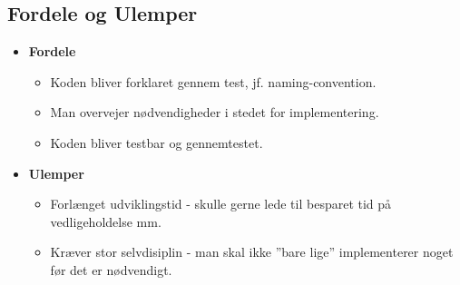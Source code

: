 \subsection{Fordele og Ulemper}

\begin{itemize}
	
	\item \textbf{Fordele}	
	\begin{itemize}
		\item Koden bliver forklaret gennem test, jf. naming-convention.
		\item Man overvejer nødvendigheder i stedet for implementering.
		\item Koden bliver testbar og gennemtestet.
	\end{itemize}
	
	\item \textbf{Ulemper}	
	\begin{itemize}
		\item Forlænget udviklingstid - skulle gerne lede til besparet tid på vedligeholdelse mm.
		\item Kræver stor selvdisiplin - man skal ikke ''bare lige'' implementerer noget før det er nødvendigt.
	\end{itemize}
		
\end{itemize}
































